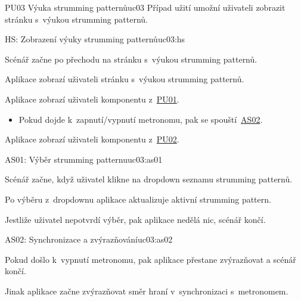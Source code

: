 \begin{usecase}{PU03 Výuka strumming patternů}{uc03}
    Případ užití umožní uživateli zobrazit stránku s~výukou strumming patternů.

    \begin{scenario}{HS: Zobrazení výuky strumming patternů}{uc03:hs}
        \item Scénář začne po přechodu na stránku s~výukou strumming patternů.
        \item Aplikace zobrazí uživateli stránku s~výukou strumming patternů.
        \item Aplikace zobrazí uživateli komponentu z~\hyperref[uc01]{PU01}.
        \begin{itemize}
            \item Pokud dojde k~zapnutí/vypnutí metronomu, pak se spouští~\hyperref[uc3:as02]{AS02}.
        \end{itemize}
        \item Aplikace zobrazí uživateli komponentu z~\hyperref[uc02]{PU02}.
    \end{scenario}


    \begin{scenario}{AS01: Výběr strumming patternu}{uc03:as01}
        \item Scénář začne, když uživatel klikne na dropdown seznamu strumming patternů.
        \item Po výběru z~dropdownu aplikace aktualizuje aktivní strumming pattern.
        \item Jestliže uživatel nepotvrdí výběr, pak aplikace nedělá nic, scénář končí.

    \end{scenario}

    \begin{scenario}{AS02: Synchronizace a zvýrazňování}{uc03:as02}
        \item Pokud došlo k~vypnutí metronomu, pak aplikace přestane zvýrazňovat a scénář končí.
        \item Jinak aplikace začne zvýrazňovat směr hraní v~synchronizaci s~metronomem.
    \end{scenario}
\end{usecase}